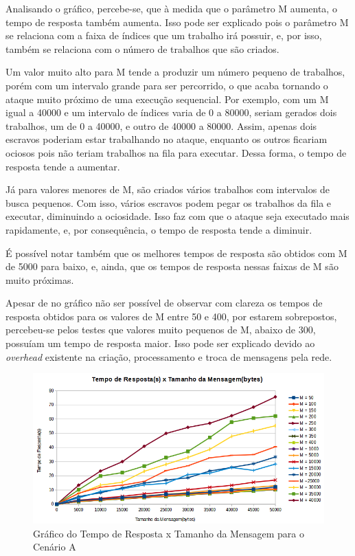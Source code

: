 \documentclass[
	12pt,				%
    oneside,			%
	a4paper,			%
	english,			%
	brazil,				%
	]{abntex2}
\begin{document}
Analisando o gráfico, percebe-se, que à medida que o parâmetro M aumenta, o tempo de resposta também aumenta. Isso pode ser explicado pois o parâmetro M se relaciona com a faixa de índices que um trabalho irá possuir, e, por isso, também se relaciona com o número de trabalhos que são criados. 

Um valor muito alto para M tende a produzir um número pequeno de trabalhos, porém com um intervalo grande para ser percorrido, o que acaba tornando o ataque muito próximo de uma execução sequencial. Por exemplo, com um M igual a 40000 e um intervalo de índices varia de 0 a 80000, seriam gerados dois trabalhos, um de 0 a 40000, e outro de 40000 a 80000. Assim, apenas dois escravos poderiam estar trabalhando no ataque, enquanto os outros ficariam ociosos pois não teriam trabalhos na fila para executar. Dessa forma, o tempo de resposta tende a aumentar.

Já para valores menores de M, são criados vários trabalhos com intervalos de busca pequenos. Com isso, vários escravos podem pegar os trabalhos da fila e executar, diminuindo a ociosidade. Isso faz com que o ataque seja executado mais rapidamente, e, por consequência, o tempo de resposta tende a diminuir.

É possível notar também que os melhores tempos de resposta são obtidos com M de 5000 para baixo, e, ainda, que os tempos de resposta nessas faixas de M são muito próximas. 

Apesar de no gráfico não ser possível de observar com clareza os tempos de resposta obtidos para os valores de M entre 50 e 400, por estarem sobrepostos, percebeu-se pelos testes que valores muito pequenos de M, abaixo de 300, possuíam um tempo de resposta maior. Isso pode ser explicado devido ao \textit{overhead} existente na criação, processamento e troca de mensagens pela rede.

\begin{figure}[!htb]
\centering
\includegraphics[scale=0.7]{figuras/A.png}
\caption{Gráfico do Tempo de Resposta x Tamanho da Mensagem para o Cenário A}
\label{fig:tempo_respostaXtamanho_msg_A}
\end{figure}
\end{document}
